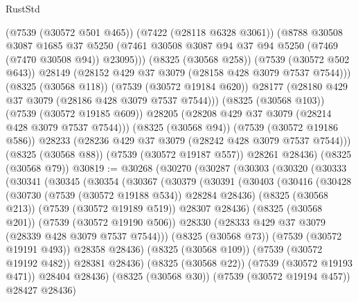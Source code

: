 \begin{lexlean}{RustStd}
\begin{coremodule}
                (@7539 (@30572 @501 @465))
                (@7422 (@28118 @6328 @3061))
                (@8788
                  @30508
                  @3087
                  @1685
                  @37
                  @5250
                  (@7461 @30508 @3087 @94 @37 @94 @5250 (@7469 (@7470 @30508 @94)) @23095)))
              (@8325 (@30568 @258))
              (@7539 (@30572 @502 @643))
              @28149
              (@28152 @429 @37 @3079 (@28158 @428 @3079 @7537 @7544)))
            (@8325 (@30568 @118))
            (@7539 (@30572 @19184 @620))
            @28177
            (@28180 @429 @37 @3079 (@28186 @428 @3079 @7537 @7544)))
          (@8325 (@30568 @103))
          (@7539 (@30572 @19185 @609))
          @28205
          (@28208 @429 @37 @3079 (@28214 @428 @3079 @7537 @7544)))
        (@8325 (@30568 @94))
        (@7539 (@30572 @19186 @586))
        @28233
        (@28236 @429 @37 @3079 (@28242 @428 @3079 @7537 @7544)))
      (@8325 (@30568 @88))
      (@7539 (@30572 @19187 @557))
      @28261
      @28436)
    (@8325 (@30568 @79))
@30819 := @30268
    (@30270
      (@30287
        (@30303
          (@30320
            (@30333
              (@30341
                (@30345
                  (@30354
                    (@30367
                      (@30379
                        (@30391
                          (@30403
                            (@30416
                              (@30428
                                (@30730 (@7539 (@30572 @19188 @534)) @28284 @28436)
                                (@8325 (@30568 @213))
                                (@7539 (@30572 @19189 @519))
                                @28307
                                @28436)
                              (@8325 (@30568 @201))
                              (@7539 (@30572 @19190 @506))
                              @28330
                              (@28333 @429 @37 @3079 (@28339 @428 @3079 @7537 @7544)))
                            (@8325 (@30568 @73))
                            (@7539 (@30572 @19191 @493))
                            @28358
                            @28436)
                          (@8325 (@30568 @109))
                          (@7539 (@30572 @19192 @482))
                          @28381
                          @28436)
                        (@8325 (@30568 @22))
                        (@7539 (@30572 @19193 @471))
                        @28404
                        @28436)
                      (@8325 (@30568 @30))
                      (@7539 (@30572 @19194 @457))
                      @28427
                      @28436)

\end{coremodule}
\end{lexlean}

